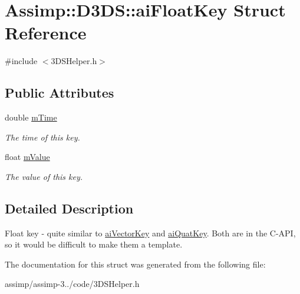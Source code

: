 \hypertarget{struct_assimp_1_1_d3_d_s_1_1ai_float_key}{\section{Assimp\+:\+:D3\+D\+S\+:\+:ai\+Float\+Key Struct Reference}
\label{struct_assimp_1_1_d3_d_s_1_1ai_float_key}
}


{\ttfamily \#include $<$3\+D\+S\+Helper.\+h$>$}

\subsection*{Public Attributes}
\begin{DoxyCompactItemize}
\item 
\hypertarget{struct_assimp_1_1_d3_d_s_1_1ai_float_key_a97f1924e30599559450eb9ff4fb5e639}{double \hyperlink{struct_assimp_1_1_d3_d_s_1_1ai_float_key_a97f1924e30599559450eb9ff4fb5e639}{m\+Time}}\label{struct_assimp_1_1_d3_d_s_1_1ai_float_key_a97f1924e30599559450eb9ff4fb5e639}

\begin{DoxyCompactList}\small\item\em The time of this key. \end{DoxyCompactList}\item 
\hypertarget{struct_assimp_1_1_d3_d_s_1_1ai_float_key_aa8607786eb4c3118d9bbfbf4e7625696}{float \hyperlink{struct_assimp_1_1_d3_d_s_1_1ai_float_key_aa8607786eb4c3118d9bbfbf4e7625696}{m\+Value}}\label{struct_assimp_1_1_d3_d_s_1_1ai_float_key_aa8607786eb4c3118d9bbfbf4e7625696}

\begin{DoxyCompactList}\small\item\em The value of this key. \end{DoxyCompactList}\end{DoxyCompactItemize}


\subsection{Detailed Description}
Float key -\/ quite similar to \hyperlink{structai_vector_key}{ai\+Vector\+Key} and \hyperlink{structai_quat_key}{ai\+Quat\+Key}. Both are in the C-\/\+A\+P\+I, so it would be difficult to make them a template. 

The documentation for this struct was generated from the following file\+:\begin{DoxyCompactItemize}
\item 
assimp/assimp-\/3../code/3\+D\+S\+Helper.\+h\end{DoxyCompactItemize}
